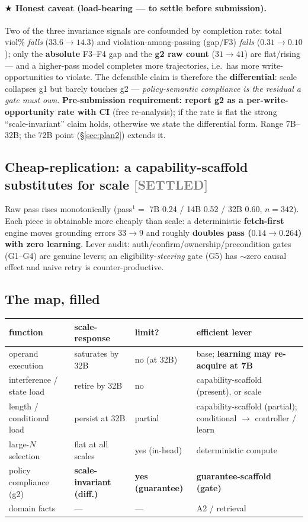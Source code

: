 \documentclass[10pt]{article}
\newcommand{\settled}{\textcolor{gray}{\small[SETTLED]}}
\begin{document}
\paragraph{$\bigstar$ Honest caveat (load-bearing --- to settle before submission).} Two of the three invariance signals are confounded by completion rate: total viol\% \emph{falls} ($33.6\to14.3$) and violation-among-passing (gap/F3) \emph{falls} ($0.31\to0.10$); only the \textbf{absolute} F3--F4 gap and the \textbf{g2 raw count} ($31\to41$) are flat/rising --- and a higher-pass model completes more trajectories, i.e.\ has more write-opportunities to violate. The defensible claim is therefore the \textbf{differential}: scale collapses g1 but barely touches g2 --- \emph{policy-semantic compliance is the residual a gate must own}. \textbf{Pre-submission requirement: report g2 as a per-write-opportunity rate with CI} (free re-analysis); if the rate is flat the strong ``scale-invariant'' claim holds, otherwise we state the differential form. Range 7B--32B; the 72B point (\S\ref{sec:plan2}) extends it.

\subsection{Cheap-replication: a capability-scaffold substitutes for scale \settled}
Raw pass rises monotonically (pass$^1=$ 7B 0.24 / 14B 0.52 / 32B 0.60, $n{=}342$). Each piece is obtainable more cheaply than scale: a deterministic \textbf{fetch-first} engine moves grounding errors $33\to9$ and roughly \textbf{doubles pass ($0.14\to0.264$) with zero learning}. Lever audit: auth/confirm/ownership/precondition gates (G1--G4) are genuine levers; an eligibility-\emph{steering} gate (G5) has $\sim$zero causal effect and naive retry is counter-productive.

\subsection{The map, filled}
\begin{center}\small\begin{tabular}{p{3.1cm}p{2.7cm}p{1.5cm}p{4.4cm}}
\toprule function & scale-response & limit? & efficient lever \\ \midrule
operand execution & saturates by 32B & no (at 32B) & base; \textbf{learning may re-acquire at 7B} \\
interference / state load & retire by 32B & no & capability-scaffold (present), or scale \\
length / conditional load & persist at 32B & partial & capability-scaffold (partial); conditional $\to$ controller / learn \\
large-$N$ selection & flat at all scales & yes (in-head) & deterministic compute \\
policy compliance (g2) & \textbf{scale-invariant (diff.)} & \textbf{yes (guarantee)} & \textbf{guarantee-scaffold (gate)} \\
domain facts & --- & --- & A2 / retrieval \\ \bottomrule
\end{tabular}\end{center}
\end{document}
